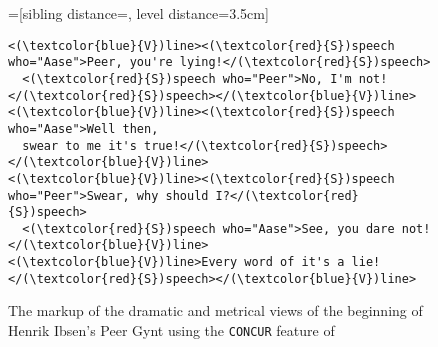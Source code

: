 \documentclass{book}
\begin{document}
        {\def\bottomfraction{0.7}\begin{figure}[hb]
          {=[sibling distance=\baselineskip, level distance=3.5cm]
          }
          \begin{Verbatim}[commandchars=\\\{\},codes={\catcode`$=3\catcode`^=7\catcode`_=8}]
<(\textcolor{blue}{V})line><(\textcolor{red}{S})speech who="Aase">Peer, you're lying!</(\textcolor{red}{S})speech>
  <(\textcolor{red}{S})speech who="Peer">No, I'm not!</(\textcolor{red}{S})speech></(\textcolor{blue}{V})line>
<(\textcolor{blue}{V})line><(\textcolor{red}{S})speech who="Aase">Well then,
  swear to me it's true!</(\textcolor{red}{S})speech></(\textcolor{blue}{V})line>
<(\textcolor{blue}{V})line><(\textcolor{red}{S})speech who="Peer">Swear, why should I?</(\textcolor{red}{S})speech>
  <(\textcolor{red}{S})speech who="Aase">See, you dare not!</(\textcolor{blue}{V})line>
<(\textcolor{blue}{V})line>Every word of it's a lie!</(\textcolor{red}{S})speech></(\textcolor{blue}{V})line>
          \end{Verbatim}
          \caption{The markup of the dramatic and metrical views of the
            beginning of Henrik Ibsen's Peer Gynt using the \texttt{CONCUR}
            feature of }
        \end{figure}}

\end{document}
